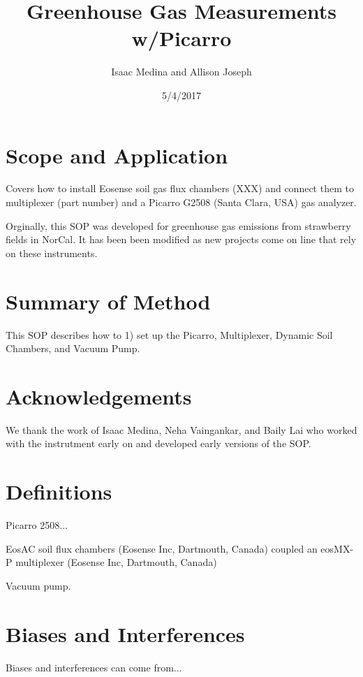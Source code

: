\documentclass[12pt]{../SOP3}\usepackage[]{graphicx}\usepackage[]{color}
\title{Greenhouse Gas Measurements w/Picarro}
\date{5/4/2017}
\author{Isaac Medina and Allison Joseph}
\begin{document}
\maketitle

\section{Scope and Application}

\NP Covers how to install Eosense soil gas flux chambers (XXX) and connect them to multiplexer (part number) and a Picarro G2508 (Santa Clara, USA) gas analyzer.

\NP Orginally, this SOP was developed for greenhouse gas emissions from strawberry fields in NorCal. It has been been modified as new projects come on line that rely on these instruments. 

\section{Summary of Method}

\NP This SOP describes how to 1) set up the Picarro, Multiplexer, Dynamic Soil Chambers, and Vacuum Pump. 

\tableofcontents

\newpage

\section{Acknowledgements}

We thank the work of Isaac Medina, Neha Vaingankar, and Baily Lai who worked with the instrutment early on and developed early versions of the SOP. 

\section{Definitions}

\NP Picarro 2508...

\NP EosAC soil flux chambers (Eosense Inc, Dartmouth, Canada) coupled an 
\NP eosMX-P multiplexer (Eosense Inc, Dartmouth, Canada)

\NP Vacuum pump.

\section{Biases and Interferences}

\NP Biases and interferences can come from...
\end{document}
